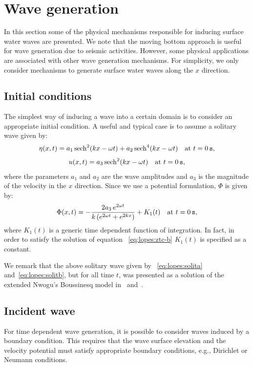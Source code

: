 \section{Wave generation}\label{sec:lopes:wavegeneration}
In this section some of the physical mechanisms responsible
for inducing surface water waves are presented.  We note
that the moving bottom approach is useful for wave
generation due to seismic activities. However, some physical
applications are associated with other wave generation
mechanisms.  For simplicity, we only consider mechanisms to
generate surface water waves along the $x$ direction.

\subsection{Initial conditions}
The simplest way of inducing a wave into a certain domain is
to consider an appropriate initial condition. A useful and
typical case is to assume a solitary wave given by:
\begin{equation}\label{eq:lopes:solita}
\eta(x,t)=a_1\,{\rm sech}^2(kx -\omega t)+a_2\,{\rm
  sech}^4(kx-\omega t)\quad {\rm at\,\,} t=0\,{\tt s},
\end{equation}
\begin{equation}\label{eq:lopes:solitb}
u(x,t)=a_3\,{\rm sech}^2(k x-\omega t) \quad {\rm at\,\,}
t=0\,{\tt s},
\end{equation}
where the parameters $a_1$ and $a_2$ are the wave amplitudes
and $a_3$ is the magnitude of the velocity in the $x$
direction.  Since we use a potential formulation, $\Phi$ is
given by:
\begin{equation}\label{eq:lopes:solitp}
\Phi(x,t)=-\frac{2a_3\,e^{2\omega t }}{k\,(e^{2\omega t
  }+e^{2k x})}+ K_1(t) \quad {\rm at\,\,} t=0\,{\tt s},
\end{equation}
where $K_1(t)$ is a generic time dependent function of
integration.
In fact, in order to satisfy the solution of equation
~\eqref{eq:lopes:ztc-b} $K_1(t)$ is specified as a constant.

We remark that the above solitary wave given by
~\eqref{eq:lopes:solita} and~\eqref{eq:lopes:solitb}, but
for all time $t$, was presented as a solution of the
extended Nwogu's Boussinesq model in~\cite{Walkley1999}
and~\cite{WeiKirby1995}.

\subsection{Incident wave}
For time dependent wave generation, it is possible to
consider waves induced by a boundary condition.  This
requires that the wave surface elevation and the velocity
potential must satisfy appropriate boundary conditions,
e.g., Dirichlet or Neumann conditions.


